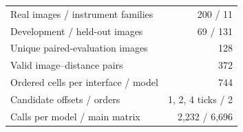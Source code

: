 \begin{tabular}{lr}
\toprule
Real images / instrument families & 200 / 11 \\
Development / held-out images & 69 / 131 \\
Unique paired-evaluation images & 128 \\
Valid image--distance pairs & 372 \\
Ordered cells per interface / model & 744 \\
Candidate offsets / orders & 1, 2, 4 ticks / 2 \\
Calls per model / main matrix & 2,232 / 6,696 \\
\bottomrule
\end{tabular}
